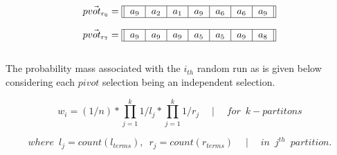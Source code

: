 \documentclass[usenames,dvipsnames,acmsmall]{acmart}
\begin{document}
\begin{equation}
	\vec{pvot_{r_{6}}} = \begin{tabular}{||c|c|c|c|c|c|c||}
		\hline
		$a_9$ & $a_2$ & $a_1$ & $a_9$ & $a_6$ & $a_6$ & $a_9$ \\
		\hline
	\end{tabular}
\end{equation} 

\begin{equation}
	\vec{pvot_{r_{7}}} = \begin{tabular}{||c|c|c|c|c|c|c||}
		\hline
		$a_9$ & $a_9$ & $a_9$ & $a_5$ & $a_5$ & $a_9$ & $a_8$ \\
		\hline
	\end{tabular}
\end{equation} \\

The probability mass associated with the $i_{th}$ random run as is given below considering each $pivot$ selection being an independent selection.

\begin{equation}
	w_i = (1 / n) * \prod_{j=1}^{k} 1 / l_j  * \prod_{j=1}^{k} 1 / r_j \quad \mid \quad for \enspace k-partitons
\end{equation}

\begin{equation}
	where \enspace l_j = count(l_{terms}), \enspace r_j = count(r_{terms}) \quad \mid \quad in \enspace j^{th} \enspace partition. 
\end{equation}
\end{document}
